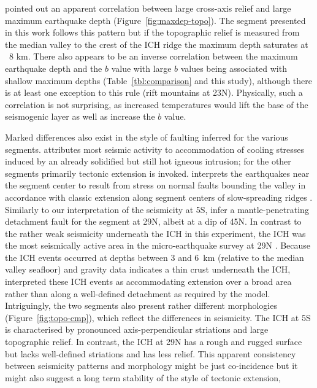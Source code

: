 \documentclass[jgr]{aguplus}
\newlength{\tw}
\begin{document}
\begin{article}
\citet{barclay01} pointed out an apparent correlation between
large cross-axis relief and large maximum earthquake depth
(Figure~\ref{fig:maxdep-topo}).  The segment presented in this work
follows this pattern but if the topographic relief is measured
from the median valley to the crest of the ICH ridge the maximum depth saturates at ~8 km.
There also appears to be an inverse correlation
between the maximum earthquake depth and the $b$ value with
large $b$ values being associated with shallow maximum depths
(Table~\ref{tbl:comparison} and this study),
although there is at least one exception to this rule (rift mountains
at 23\dg N).  Physically, such a correlation is not surprising, as
increased temperatures would lift the base of the seismogenic
layer as well as increase the $b$ value.

Marked differences also
exist in  the style of faulting inferred for the various segments.
\citet{kong92} attributes most seismic activity to accommodation of
cooling stresses induced by an already solidified but still hot
igneous intrusion; for the other segments primarily tectonic extension
is invoked.  \citet{barclay01} interprets the earthquakes
 near the
segment center to result from  stress on normal faults bounding the
valley in accordance with classic extension along segment centers of
slow-spreading ridges \citep{mutter92}.   Similarly to our
interpretation of the seismicity at 5\dg S, \citet{toomey88} infer a
mantle-penetrating detachment fault for the segment at 29\dg N, albeit
at a dip of 45\dg N.  In contrast to the rather weak seismicity
underneath the ICH in this experiment, the ICH was the most
seismically active area in the micro-earthquake survey at 29\dg N
\citep{wolfe95}. Because the ICH events occurred at depths between 3
and 6~km (relative to the median valley seafloor) and gravity data
indicates a thin crust underneath the ICH, \citet{wolfe95} interpreted
these ICH events as accommodating extension over a broad area rather
than along a well-defined detachment as required by the
\citet{tucholke94} model.   Intriguingly, the two segments also
present rather different morphologies (Figure~\ref{fig:topo-cmp}),
which reflect the differences in seismicity.  The ICH at
5\dg S is characterised by pronounced axis-perpendicular striations
and large topographic relief.  In contrast, the ICH at 29\dg N has a
rough and rugged surface but lacks well-defined striations and has
less relief.  This apparent consistency between seismicity patterns
and morphology might  be just co-incidence but it might also
suggest a long term stability of the style of tectonic extension,

\end{article}
\end{document}
